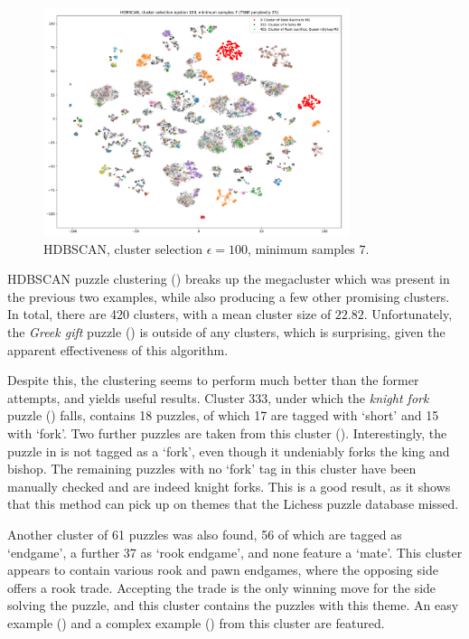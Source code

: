 \begin{figure}[H]
  \centering
  \includegraphics[width=0.8\textwidth]{project/img/tsne/hdbscan_2_25.png}
  \caption{HDBSCAN, cluster selection $\epsilon=100$, minimum samples $7$.}
  \label{tsne3}
\end{figure}

HDBSCAN puzzle clustering () breaks up the megacluster which was
present in the previous two examples, while also producing a few other
promising clusters. In total, there are 420 clusters, with a mean cluster size
of $22.82$. Unfortunately, the \emph{Greek gift} puzzle () is
outside of any clusters, which is surprising, given the apparent effectiveness
of this algorithm.

Despite this, the clustering seems to perform much better than the former
attempts, and yields useful results. Cluster 333, under which the \emph{knight
fork} puzzle () falls, contains 18 puzzles, of which 17 are
tagged with `short' and 15 with `fork'. Two further puzzles are taken from this
cluster (). Interestingly, the puzzle in  is
not tagged as a `fork', even though it undeniably forks the king and bishop.
The remaining puzzles with no `fork' tag in this cluster have been manually
checked and are indeed knight forks. This is a good result, as it shows that
this method can pick up on themes that the Lichess puzzle database missed.

Another cluster of 61 puzzles was also found, 56 of which are tagged as
`endgame', a further 37 as `rook endgame', and none feature a `mate'. This
cluster appears to contain various rook and pawn endgames, where the opposing
side offers a rook trade. Accepting the trade is the only winning move for the
side solving the puzzle, and this cluster contains the puzzles with this theme.
An easy example () and a complex example () from
this cluster are featured.

